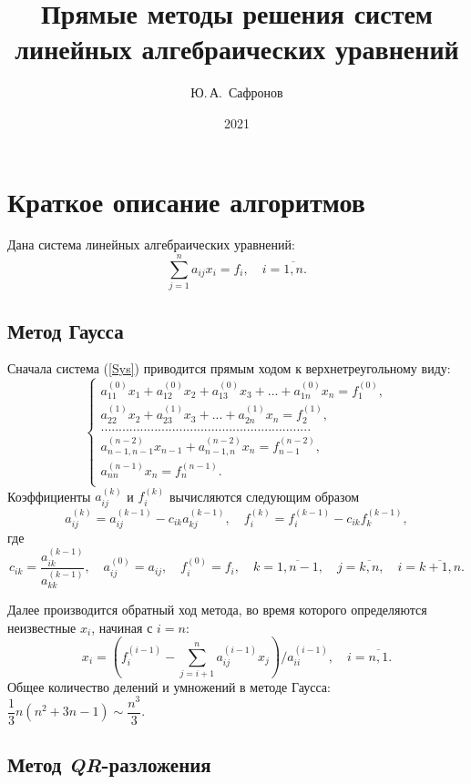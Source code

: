 \documentclass[12pt, a4paper]{article}
\title{Прямые методы решения систем линейных алгебраических уравнений}
\author{Ю.\,А.~Сафронов}
\date{2021}
\def\hmath$#1${\texorpdfstring{{\rmfamily\textit{#1}}}{#1}}
\begin{document}
\maketitle
\tableofcontents 
\newpage

\section{Краткое описание алгоритмов}
Дана система линейных алгебраических уравнений:
\begin{equation}
\sum_{j=1}^{n} a_{ij}x_i = f_i , \quad i = \overline{1,n}.
\label{Sys}
\end{equation}

\subsection{Метод Гаусса}
Сначала система (\ref{Sys}) приводится прямым ходом к верхнетреугольному виду: 
\[\left\{
\begin{aligned}
a_{11}^{(0)}x_1 + a_{12}^{(0)}x_2 + a_{13}^{(0)}x_3 + ... + a_{1n}^{(0)}x_n = f_1^{(0)},\\
a_{22}^{(1)}x_2 + a_{23}^{(1)}x_3 + ... + a_{2n}^{(1)}x_n = f_2^{(1)},\\
...........................................................\\
a_{n-1,n-1}^{(n-2)}x_{n-1} + a_{n-1,n}^{(n-2)}x_n = f_{n-1}^{(n-2)},\\
a_{nn}^{(n-1)}x_n = f_{n}^{(n-1)}.\\
\end{aligned}
\right.
\]
Коэффициенты $a_{ij}^{(k)}$ и $f_i^{(k)}$ вычисляются следующим образом
\[
a_{ij}^{(k)} = a_{ij}^{(k-1)} - c_{ik}a_{kj}^{(k-1)}, \quad f_{i}^{(k)} = f_{i}^{(k-1)} - c_{ik}f_{k}^{(k-1)}, 
\]
где
\[
c_{ik} = \dfrac{a_{ik}^{(k-1)}}{a_{kk}^{(k-1)}}, \quad a_{ij}^{(0)}=a_{ij}, \quad f_{i}^{(0)} = f_i, \quad k = \overline{1,n-1},\quad j =\overline{k,n}, \quad i = \overline{k+1,n}.
\]

Далее производится обратный ход метода, во время которого определяются неизвестные $x_i$, начиная с $i = n$:
\[
x_i =\left(f_i^{(i-1)}-\sum_{j=i+1}^{n} a_{ij}^{(i-1)}x_j\right)/a_{ii}^{(i-1)}, \quad i = \overline{n,1}.
\]
Общее количество делений и умножений в методе Гаусса: $\dfrac{1}{3}n(n^2+3n-1) \sim \dfrac{n^3}{3}$.

\newpage

\subsection {Метод \hmath $QR$-разложения}
\end{document}
